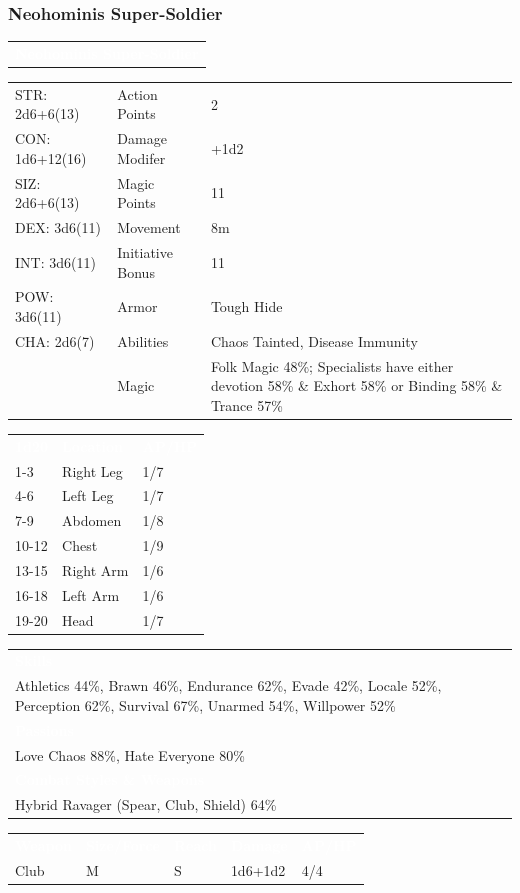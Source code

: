 \documentclass[letterpaper,serif]{rpg-module}
\begin{document}
\subsubsection{Neohominis Super-Soldier}

\lipsum[1]

\vspace{12pt}

\noindent\begin{tabularx}{\linewidth}{X}
\rowcolor{gray}
\textcolor{white}{\textbf{Neohominis Super-Soldier}}
\end{tabularx}
\begin{tabularx}{\linewidth}{XXX}
STR: 2d6+6(13) & Action Points & 2 \\
CON: 1d6+12(16) & Damage Modifer & +1d2 \\
SIZ: 2d6+6(13) & Magic Points & 11 \\
DEX: 3d6(11) & Movement & 8m \\
INT: 3d6(11) & Initiative Bonus & 11 \\
POW: 3d6(11) & Armor & Tough Hide \\
CHA: 2d6(7) & Abilities & Chaos Tainted, Disease Immunity \\
    & Magic & Folk Magic 48\%; Specialists have either devotion 58\% \& Exhort 58\% or Binding 58\% \& Trance 57\%
\end{tabularx}
\begin{tabularx}{\linewidth}{XXX}
\rowcolor{gray}
\textcolor{white}{\textbf{1d20}} & \textcolor{white}{\textbf{Location}} & \textcolor{white}{\textbf{AP/HP}} \\
1-3 & Right Leg & 1/7 \\
4-6 & Left Leg & 1/7 \\
7-9 & Abdomen & 1/8 \\
10-12 & Chest & 1/9 \\
13-15 & Right Arm & 1/6 \\
16-18 & Left Arm & 1/6 \\
19-20 & Head & 1/7 
\end{tabularx}
\begin{tabularx}{\linewidth}{X}
\rowcolor{gray}
\textcolor{white}{\textbf{Skills}} \\
Athletics 44\%, Brawn 46\%, Endurance 62\%, Evade 42\%, Locale 52\%, Perception 62\%, Survival 67\%, Unarmed 54\%, Willpower 52\%\\
\rowcolor{gray}
\textcolor{white}{\textbf{Passions}} \\
Love Chaos 88\%, Hate Everyone 80\% \\
\rowcolor{gray}
\textcolor{white}{\textbf{Combat Styles \& Weapons}} \\
Hybrid Ravager (Spear, Club, Shield) 64\%
\end{tabularx}
\begin{tabularx}{\linewidth}{XXXXX}
\rowcolor{gray}
\textcolor{white}{\textbf{Weapon}} & \textcolor{white}{\textbf{Size/Force}} & \textcolor{white}{\textbf{Reach}} & \textcolor{white}{\textbf{Damage}} & \textcolor{white}{\textbf{AP/HP}} \\
Club & M & S & 1d6+1d2 & 4/4
\end{tabularx}
\end{document}
